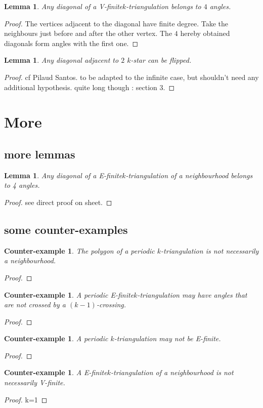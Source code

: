 \documentclass{amsart}
\newtheorem{lemma}[theorem]{Lemma}
\newtheorem{ce}[theorem]{Counter-example}
\theoremstyle{remark}
\newcommand*{\nbd}[0]{neighbourhood\xspace}
\newcommand*{\ef}[0]{E-finite\xspace}
\newcommand*{\vf}[0]{V-finite\xspace}
\newcommand*{\ktg}[0]{$k$-triangulation\xspace}
\begin{document}
\begin{lemma}
Any diagonal of a \vf \ktg belongs to $4$ angles.
\end{lemma}
\begin{proof}
The vertices adjacent to the diagonal have finite degree. Take the neighbours just before and after the other vertex. The $4$ hereby obtained diagonals form angles with the first one.
\end{proof}

\begin{lemma}
Any diagonal adjacent to $2$ $k$-star can be flipped.
\end{lemma}
\begin{proof}
cf Pilaud Santos. to be adapted to the infinite case, but shouldn't need any additional hypothesis. quite long though : section 3.
\end{proof}

\section{More}

\subsection{more lemmas}

\begin{lemma} 
Any diagonal of a \ef \ktg of a \nbd belongs to 4 angles. 
\end{lemma}
\begin{proof}
see direct proof on sheet.
\end{proof}

\subsection{some counter-examples}

\begin{ce}
The polygon of a periodic \ktg is not necessarily a \nbd.
\end{ce}
\begin{proof}

\end{proof}

\begin{ce}
A periodic \ef \ktg may have angles that are not crossed by a $(k-1)$-crossing.
\end{ce}
\begin{proof}

\end{proof}

\begin{ce} 
A periodic \ktg may not be \ef.
\end{ce}
\begin{proof}

\end{proof}

\begin{ce}
A \ef \ktg of a \nbd is not necessarily \vf.
\end{ce}
\begin{proof}
k=1
\end{proof}





\end{document}
